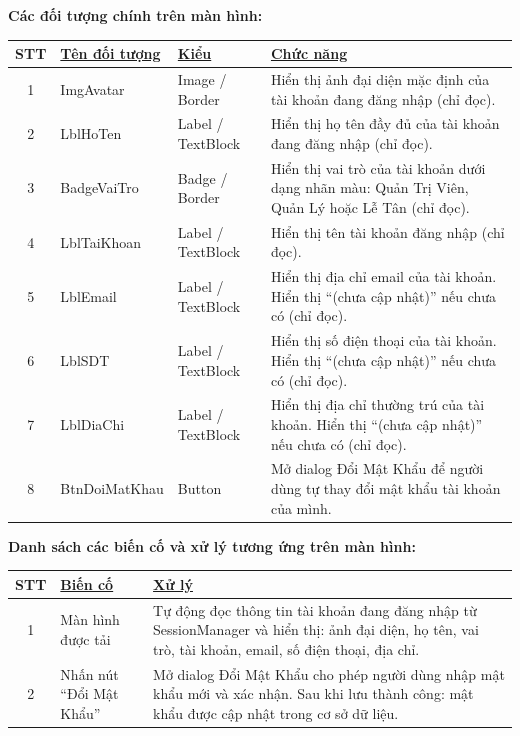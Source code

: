 \documentclass[a4paper]{article}
\newcommand{\th}[1]{\textbf{\underline{#1}}}
\begin{document}

\noindent\textbf{Các đối tượng chính trên màn hình:}

\vspace{0.4em}

\begin{tabular}{|c|p{4cm}|p{3.2cm}|p{7cm}|}
\hline
\textbf{STT} & \th{Tên đối tượng} & \th{Kiểu} & \th{Chức năng} \\
\hline
1 & ImgAvatar
  & Image / Border
  & Hiển thị ảnh đại diện mặc định của tài khoản đang đăng nhập
    (chỉ đọc). \\
\hline
2 & LblHoTen
  & Label / TextBlock
  & Hiển thị họ tên đầy đủ của tài khoản đang đăng nhập
    (chỉ đọc). \\
\hline
3 & BadgeVaiTro
  & Badge / Border
  & Hiển thị vai trò của tài khoản dưới dạng nhãn màu:
    Quản Trị Viên, Quản Lý hoặc Lễ Tân (chỉ đọc). \\
\hline
4 & LblTaiKhoan
  & Label / TextBlock
  & Hiển thị tên tài khoản đăng nhập (chỉ đọc). \\
\hline
5 & LblEmail
  & Label / TextBlock
  & Hiển thị địa chỉ email của tài khoản. Hiển thị
    ``(chưa cập nhật)'' nếu chưa có (chỉ đọc). \\
\hline
6 & LblSDT
  & Label / TextBlock
  & Hiển thị số điện thoại của tài khoản. Hiển thị
    ``(chưa cập nhật)'' nếu chưa có (chỉ đọc). \\
\hline
7 & LblDiaChi
  & Label / TextBlock
  & Hiển thị địa chỉ thường trú của tài khoản. Hiển thị
    ``(chưa cập nhật)'' nếu chưa có (chỉ đọc). \\
\hline
8 & BtnDoiMatKhau
  & Button
  & Mở dialog Đổi Mật Khẩu để người dùng tự thay đổi mật
    khẩu tài khoản của mình. \\
\hline
\end{tabular}

\vspace{1.2em}

\noindent\textbf{Danh sách các biến cố và xử lý tương ứng trên màn hình:}

\vspace{0.4em}

\begin{tabular}{|c|p{4.5cm}|p{9.5cm}|}
\hline
\textbf{STT} & \th{Biến cố} & \th{Xử lý} \\
\hline
1 & Màn hình được tải
  & Tự động đọc thông tin tài khoản đang đăng nhập từ
    SessionManager và hiển thị: ảnh đại diện, họ tên, vai trò,
    tài khoản, email, số điện thoại, địa chỉ. \\
\hline
2 & Nhấn nút ``Đổi Mật Khẩu''
  & Mở dialog Đổi Mật Khẩu cho phép người dùng nhập mật khẩu
    mới và xác nhận. Sau khi lưu thành công: mật khẩu được
    cập nhật trong cơ sở dữ liệu. \\
\hline
\end{tabular}
\end{document}
